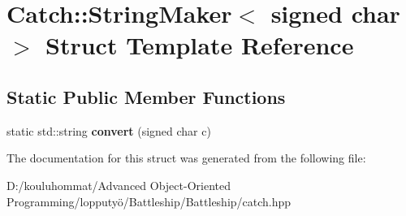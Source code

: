 \hypertarget{struct_catch_1_1_string_maker_3_01signed_01char_01_4}{}\section{Catch\+:\+:String\+Maker$<$ signed char $>$ Struct Template Reference}
\label{struct_catch_1_1_string_maker_3_01signed_01char_01_4}
\subsection*{Static Public Member Functions}
\begin{DoxyCompactItemize}
\item 
\mbox{\label{struct_catch_1_1_string_maker_3_01signed_01char_01_4_a5ec41f32916539dc90130539db8222cf}} 
static std\+::string {\bfseries convert} (signed char c)
\end{DoxyCompactItemize}


The documentation for this struct was generated from the following file\+:\begin{DoxyCompactItemize}
\item 
D\+:/kouluhommat/\+Advanced Object-\/\+Oriented Programming/lopputyö/\+Battleship/\+Battleship/catch.\+hpp\end{DoxyCompactItemize}
